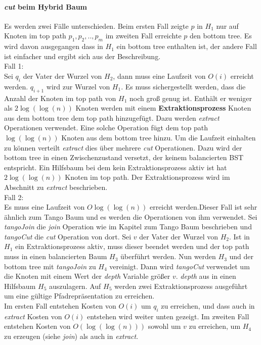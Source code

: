 \documentclass[a4paper,12pt]{article}
\begin{document}
\paragraph{\textit{cut} beim Hybrid Baum}
Es werden zwei Fälle unterschieden. Beim ersten Fall zeigte $p$ in $H_1$ nur auf Knoten im top path $p_1,p_2,..,p_m$ im zweiten Fall erreichte $p$ den bottom tree. Es wird davon ausgegangen dass in $H_1$ ein bottom tree enthalten ist, der andere Fall ist einfacher und ergibt sich aus der Beschreibung.\\
Fall 1:\\
Sei $q_i$ der Vater der Wurzel von $H_2$, dann muss eine Laufzeit von $O\left(i\right)$ erreicht werden. $q_{i+1}$ wird zur Wurzel von $H_1$. Es muss sichergestellt werden, dass die Anzahl der Knoten im top path von $H_1$ noch groß genug ist. Enthält er weniger als $2 \log\left(\log\left(n\right)\right)$ Knoten werden mit einem \textbf{Extraktionsprozess} Knoten aus dem bottom tree dem top path hinzugefügt. Dazu werden \textit{extract} Operationen verwendet. Eine solche Operation fügt dem top path $\log\left(\log\left(n\right)\right)$ Knoten aus dem bottom tree hinzu. Um die Laufzeit einhalten zu können verteilt {\textit{extract}} dies über mehrere \textit{cut} Operationen. Dazu wird der bottom tree in einen Zwischenzustand versetzt, der keinem balancierten BST entspricht. Ein Hilfsbaum bei dem kein Extraktionsprozess aktiv ist hat  $2 \log\left(\log\left(n\right)\right)$ Knoten im top path. Der Extraktionsprozess wird im Abschnitt zu \textit{extract} beschrieben.  \\
Fall 2:\\
Es muss eine Laufzeit von $O\log\left(\log\left(n\right)\right)$ erreicht werden.Dieser Fall ist sehr ähnlich zum Tango Baum und es werden die Operationen von ihm verwendet. Sei \textit{tangoJoin} die \textit{join} Operation wie im Kapitel zum Tango Baum beschrieben und \textit{tangoCut} die \textit{cut} Operation von dort. Sei $v$ der Vater der Wurzel von $H_2$. Ist in $H_1$ ein Extraktionsprozess aktiv, muss dieser beendet werden und der top path muss in einen balancierten Baum $H_3$ überführt werden. Nun werden $H_3$ und der bottom tree mit \textit{tangoJoin}  zu $H_4$ vereinigt. Dann wird \textit{tangoCut} verwendet um die Knoten mit einem Wert der \textit{depth} Variable größer $v.$ \textit{depth} aus in einen Hilfsbaum $H_5$ auszulagern. Auf $H_5$ werden zwei Extraktionsprozess ausgeführt um eine gültige Pfadrepräsentation zu erreichen.  \\
Im ersten Fall entstehen Kosten von $O\left(i\right)$ um $q_i$ zu erreichen, und dass auch in \textit{extract} Kosten von $O\left(i\right)$ entstehen wird weiter unten gezeigt. Im zweiten Fall entstehen Kosten von $O\left(\log\left(\log\left(n\right)\right)\right)$ sowohl um $v$ zu erreichen, um $H_4$ zu erzeugen (siehe \textit{join}) als auch in \textit{extract}.
\end{document}
